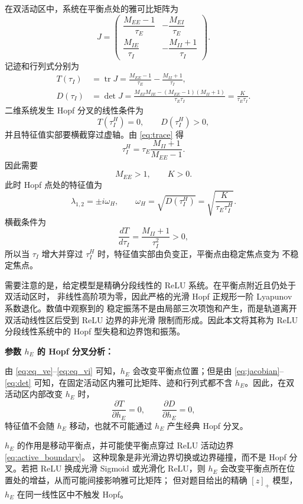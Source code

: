 \documentclass[UTF8]{ctexart}
\begin{document}
在双活动区中，系统在平衡点处的雅可比矩阵为
\begin{equation}
	J=
	\begin{pmatrix}
		\dfrac{M_{EE}-1}{\tau_E} & -\dfrac{M_{EI}}{\tau_E}\\[8pt]
		\dfrac{M_{IE}}{\tau_I} & -\dfrac{M_{II}+1}{\tau_I}
	\end{pmatrix}.
	\label{eq:jacobian}
\end{equation}
记迹和行列式分别为
\begin{align}
	T(\tau_I)
	&=\operatorname{tr}J
	=\frac{M_{EE}-1}{\tau_E}-\frac{M_{II}+1}{\tau_I},
	\label{eq:trace}\\
	D(\tau_I)
	&=\det J
	=\frac{M_{EI}M_{IE}-(M_{EE}-1)(M_{II}+1)}
	{\tau_E\tau_I}
	=\frac{K}{\tau_E\tau_I}.
	\label{eq:det}
\end{align}
二维系统发生 Hopf 分叉的线性条件为
\[
T(\tau_I^H)=0,\qquad D(\tau_I^H)>0,
\]
并且特征值实部要横截穿过虚轴。由 \eqref{eq:trace} 得
\begin{equation}
	\tau_I^H
	=\tau_E\frac{M_{II}+1}{M_{EE}-1}.
	\label{eq:tau_hopf}
\end{equation}
因此需要
\[
M_{EE}>1,\qquad K>0.
\]
此时 Hopf 点处的特征值为
\[
\lambda_{1,2}=\pm i\omega_H,\qquad
\omega_H=\sqrt{D(\tau_I^H)}
=\sqrt{\frac{K}{\tau_E\tau_I^H}}.
\]
横截条件为
\[
\frac{dT}{d\tau_I}
=\frac{M_{II}+1}{\tau_I^2}>0,
\]
所以当 $\tau_I$ 增大并穿过 $\tau_I^H$ 时，特征值实部由负变正，平衡点由稳定焦点变为
不稳定焦点。

需要注意的是，给定模型是精确分段线性的 ReLU 系统。在平衡点附近且仍处于双活动区时，
非线性高阶项为零，因此严格的光滑 Hopf 正规形一阶 Lyapunov 系数退化。数值中观察到的
稳定振荡不是由局部三次项饱和产生，而是轨道离开双活动线性区后受到 ReLU 边界的非光滑
限制而形成。因此本文将其称为 ReLU 分段线性系统中的 Hopf 型失稳和边界饱和振荡。

\textbf{参数 $h_E$ 的 Hopf 分叉分析：}

由 \eqref{eq:eq_ve}--\eqref{eq:eq_vi} 可知，$h_E$ 会改变平衡点位置；但是由
\eqref{eq:jacobian}--\eqref{eq:det} 可知，在固定活动区内雅可比矩阵、迹和行列式都不含
$h_E$。因此，在双活动区内部改变 $h_E$ 时，
\[
\frac{\partial T}{\partial h_E}=0,\qquad
\frac{\partial D}{\partial h_E}=0,
\]
特征值不会随 $h_E$ 移动，也就不可能通过 $h_E$ 产生经典 Hopf 分叉。

$h_E$ 的作用是移动平衡点，并可能使平衡点穿过 ReLU 活动边界 \eqref{eq:active_boundary}。
这种现象是非光滑边界切换或边界碰撞，而不是 Hopf 分叉。若把 ReLU 换成光滑 Sigmoid
或光滑化 ReLU，则 $h_E$ 会改变平衡点所在位置处的增益，从而可能间接影响雅可比矩阵；
但对题目给出的精确 $[z]_+$ 模型，$h_E$ 在同一线性区中不触发 Hopf。
\end{document}
